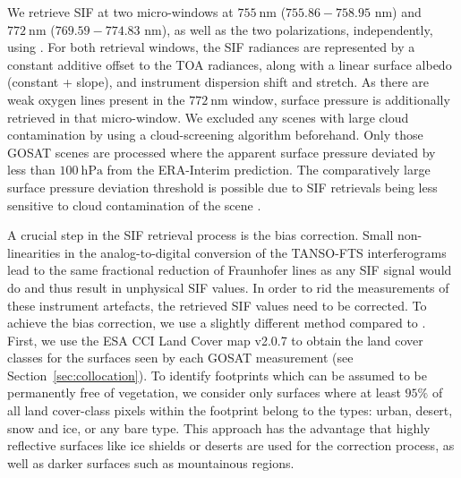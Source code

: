 \documentclass[preprint, a4paper, 10pt, times, 5p]{elsarticle}
\begin{document}
We retrieve SIF at two micro-windows at $755\:\mathrm{nm}$ ($755.86 - 758.95$ nm) and $772\:\mathrm{nm}$ ($769.59 - 774.83$ nm), as well as the two polarizations, independently, using \citet{Frankenberg2011}. For both retrieval windows, the SIF radiances are represented by a constant additive offset to the TOA radiances, along with a linear surface albedo (constant + slope), and instrument dispersion shift and stretch. As there are weak oxygen lines present in the $772\:\mathrm{nm}$ window, surface pressure is additionally retrieved in that micro-window. We excluded any scenes with large cloud contamination by using a cloud-screening algorithm beforehand. Only those GOSAT scenes are processed where the apparent surface pressure deviated by less than $100\:\mathrm{hPa}$ from the ERA-Interim prediction. The comparatively large surface pressure deviation threshold is possible due to SIF retrievals being less sensitive to cloud contamination of the scene \citep{frankenberg2012remote}.

A crucial step in the SIF retrieval process is the bias correction. Small non-linearities in the analog-to-digital conversion of the TANSO-FTS interferograms lead to the same fractional reduction of Fraunhofer lines as any SIF signal would do and thus result in unphysical SIF values. In order to rid the measurements of these instrument artefacts, the retrieved SIF values need to be corrected. To achieve the bias correction, we use a slightly different method compared to \citet{Frankenberg2011}. First, we use the ESA CCI Land Cover map v2.0.7 \citep{Bontemps2013} to obtain the land cover classes for the surfaces seen by each GOSAT measurement (see Section~\ref{sec:collocation}). To identify footprints which can be assumed to be permanently free of vegetation, we consider only surfaces where at least $95\%$ of all land cover-class pixels within the footprint belong to the types: urban, desert, snow and ice, or any bare type. This approach has the advantage that highly reflective surfaces like ice shields or deserts are used for the correction process, as well as darker surfaces such as mountainous regions.
\end{document}
